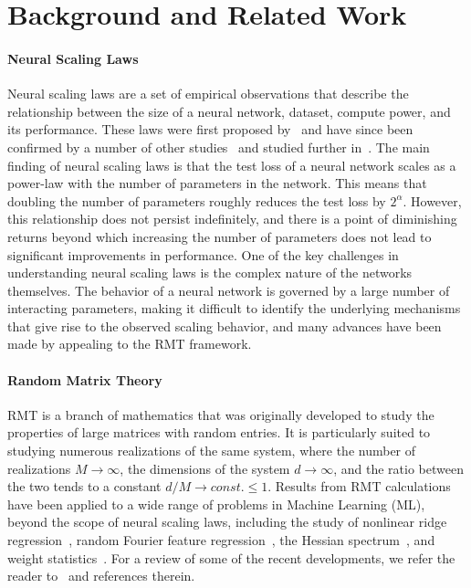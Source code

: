 \documentclass{article}
\begin{document}
\section{Background and Related Work}
\label{back}
\paragraph{Neural Scaling Laws}
Neural scaling laws are a set of empirical observations that describe the relationship between the size of a neural network, dataset, compute power, and its performance. These laws were first proposed by~\citet{kaplan2020scaling} and have since been confirmed by a number of other studies~\cite{maloney2022solvable, hernandez2022scaling} and studied further in~\citep{DBLP:conf/emnlp/IvgiCB22, DBLP:conf/nips/AlabdulmohsinNZ22, DBLP:journals/jmlr/SharmaK22, DBLP:conf/nips/SorscherGSGM22, DBLP:journals/corr/abs-2302-09049, DBLP:journals/corr/abs-2302-09650}.
The main finding of neural scaling laws is that the test loss of a neural network scales as a power-law with the number of parameters in the network. This means that doubling the number of parameters roughly reduces the test loss by $2^\alpha$. However, this relationship does not persist indefinitely, and there is a point of diminishing returns beyond which increasing the number of parameters does not lead to significant improvements in performance.
One of the key challenges in understanding neural scaling laws is the complex nature of the networks themselves. The behavior of a neural network is governed by a large number of interacting parameters, making it difficult to identify the underlying mechanisms that give rise to the observed scaling behavior, and many advances have been made by appealing to the RMT framework.
%
\paragraph{Random Matrix Theory}
RMT is a branch of mathematics that was originally developed to study the properties of large matrices with random entries. It is particularly suited to studying numerous realizations of the same system, where the number of realizations $M \to \infty$, the dimensions of the system $d \to \infty$, and the ratio between the two tends to a constant $d/M \to const. \leq 1$. Results from RMT calculations have been applied to a wide range of problems in Machine Learning (ML), beyond the scope of neural scaling laws, including the study of nonlinear ridge regression~\cite{pennington2017nonlinear}, random Fourier feature regression~\cite{Liao_2021}, the Hessian spectrum~\cite{liao2021hessian}, and weight statistics~\cite{martin2019traditional}. For a review of some of the recent developments, we refer the reader to~\citet{couillet_liao_2022} and references therein.
\end{document}
